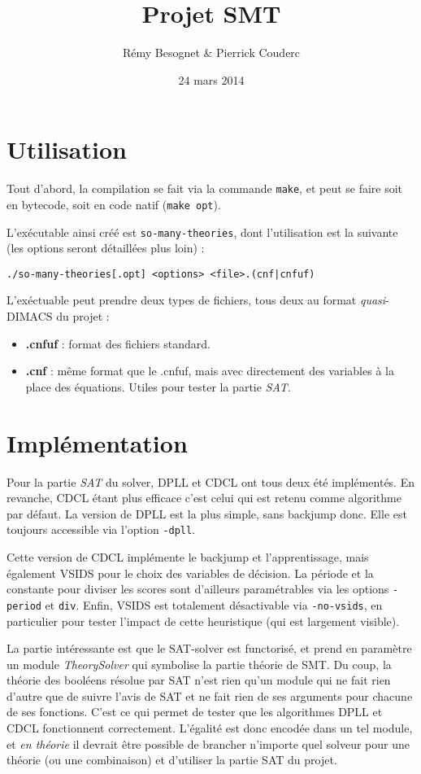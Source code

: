 \documentclass{article}
\author{Rémy Besognet \& Pierrick Couderc}
\date{24 mars 2014}
\title{Projet SMT}
\begin{document}
\maketitle

\section{Utilisation}

Tout d'abord, la compilation se fait via la commande \texttt{make}, et peut se
faire soit en bytecode, soit en code natif (\texttt{make opt}).

L'exécutable ainsi créé est \texttt{so-many-theories}, dont l'utilisation est la
suivante (les options seront détaillées plus loin) :
\begin{center}
  \texttt{./so-many-theories[.opt] <options> <file>.(cnf|cnfuf)}
\end{center}

L'exéctuable peut prendre deux types de fichiers, tous deux au format
\emph{quasi}-DIMACS du projet :
\begin{itemize}
\item \textbf{.cnfuf} : format des fichiers standard.
\item \textbf{.cnf} : même format que le .cnfuf, mais avec directement des
  variables à la place des équations. Utiles pour tester la partie \emph{SAT}.
\end{itemize}

\section{Implémentation}


Pour la partie \emph{SAT} du solver, DPLL et CDCL ont tous deux été
implémentés. En revanche, CDCL étant plus efficace c'est celui qui est
retenu comme algorithme par défaut. La version de DPLL est la plus
simple, sans backjump donc. Elle est toujours accessible via l'option
\texttt{-dpll}.

Cette version de CDCL implémente le backjump et l'apprentissage, mais
également VSIDS pour le choix des variables de décision. La période et
la constante pour diviser les scores sont d'ailleurs paramétrables via
les options \texttt{-period} et \texttt{div}. Enfin, VSIDS est
totalement désactivable via \texttt{-no-vsids}, en particulier pour
tester l'impact de cette heuristique (qui est largement visible).

La partie intéressante est que le SAT-solver est functorisé, et prend
en paramètre un module \emph{TheorySolver} qui symbolise la partie
théorie de SMT. Du coup, la théorie des booléens résolue par SAT n'est
rien qu'un module qui ne fait rien d'autre que de suivre l'avis de SAT
et ne fait rien de ses arguments pour chacune de ses fonctions. C'est
ce qui permet de tester que les algorithmes DPLL et CDCL fonctionnent
correctement. L'égalité est donc encodée dans un tel module, et
\emph{en théorie} il devrait être possible de brancher n'importe quel
solveur pour une théorie (ou une combinaison) et d'utiliser la partie
SAT du projet.
\end{document}
